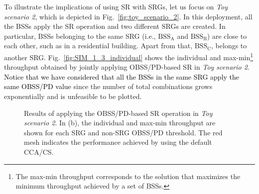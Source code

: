 \documentclass[preprint,12pt]{elsarticle}
\begin{document}
To illustrate the implications of using SR with SRGs, let us focus on \emph{Toy scenario 2}, which is depicted in Fig.~\ref{fig:toy_scenario_2}. In this deployment, all the BSSs apply the SR operation and two different SRGs are created. In particular, BSSs belonging to the same SRG (i.e., $\text{BSS}_\text{A}$ and $\text{BSS}_\text{B}$) are close to each other, such as in a residential building. Apart from that, $\text{BSS}_\text{C}$, belongs to another SRG. Fig.~\ref{fig:SIM_1_3_individual} shows the individual and max-min\footnote{The max-min throughput corresponds to the solution that maximizes the minimum throughput achieved by a set of BSSs.} throughput obtained by jointly applying OBSS/PD-based SR in \emph{Toy scenario 2}. \textcolor{black}{Notice that we have considered that all the BSSs in the same SRG apply the same OBSS/PD value} since the number of total combinations grows exponentially and is unfeasible to be plotted. 

\begin{figure}[ht!]
	\centering
	\hspace{1cm}
	\caption{Results of applying the OBSS/PD-based SR operation in \emph{Toy scenario 2}. In (b), the individual and max-min throughput are shown for each SRG and non-SRG OBSS/PD threshold. The red mesh indicates the performance achieved by using the default CCA/CS.}
	\label{fig:fig:17}
\end{figure}
\end{document}
